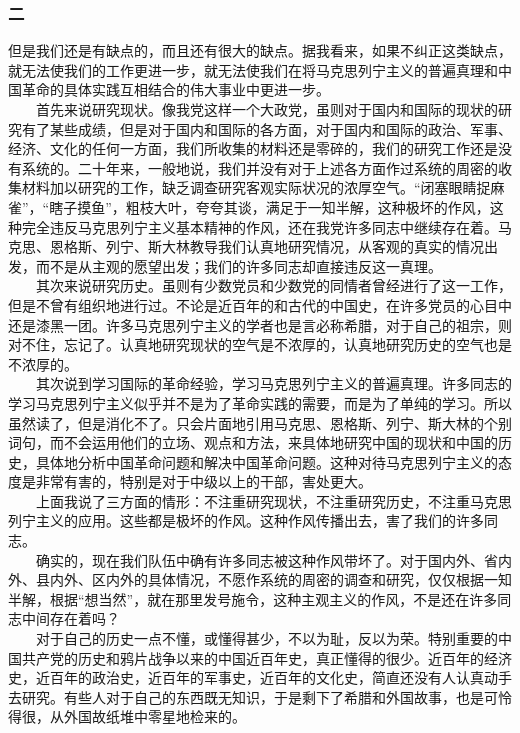 \documentclass[cn,11pt,chinese]{elegantbook}
\def\myformat#1{\hfil\hfil #1}
\begin{document}
\subsubsection*{\myformat{二}}
但是我们还是有缺点的，而且还有很大的缺点。据我看来，如果不纠正这类缺点，就无法使我们的工作更进一步，就无法使我们在将马克思列宁主义的普遍真理和中国革命的具体实践互相结合的伟大事业中更进一步。\\
　　首先来说研究现状。像我党这样一个大政党，虽则对于国内和国际的现状的研究有了某些成绩，但是对于国内和国际的各方面，对于国内和国际的政治、军事、经济、文化的任何一方面，我们所收集的材料还是零碎的，我们的研究工作还是没有系统的。二十年来，一般地说，我们并没有对于上述各方面作过系统的周密的收集材料加以研究的工作，缺乏调查研究客观实际状况的浓厚空气。“闭塞眼睛捉麻雀”，“瞎子摸鱼”，粗枝大叶，夸夸其谈，满足于一知半解，这种极坏的作风，这种完全违反马克思列宁主义基本精神的作风，还在我党许多同志中继续存在着。马克思、恩格斯、列宁、斯大林教导我们认真地研究情况，从客观的真实的情况出发，而不是从主观的愿望出发；我们的许多同志却直接违反这一真理。\\
　　其次来说研究历史。虽则有少数党员和少数党的同情者曾经进行了这一工作，但是不曾有组织地进行过。不论是近百年的和古代的中国史，在许多党员的心目中还是漆黑一团。许多马克思列宁主义的学者也是言必称希腊，对于自己的祖宗，则对不住，忘记了。认真地研究现状的空气是不浓厚的，认真地研究历史的空气也是不浓厚的。\\
　　其次说到学习国际的革命经验，学习马克思列宁主义的普遍真理。许多同志的学习马克思列宁主义似乎并不是为了革命实践的需要，而是为了单纯的学习。所以虽然读了，但是消化不了。只会片面地引用马克思、恩格斯、列宁、斯大林的个别词句，而不会运用他们的立场、观点和方法，来具体地研究中国的现状和中国的历史，具体地分析中国革命问题和解决中国革命问题。这种对待马克思列宁主义的态度是非常有害的，特别是对于中级以上的干部，害处更大。\\
　　上面我说了三方面的情形：不注重研究现状，不注重研究历史，不注重马克思列宁主义的应用。这些都是极坏的作风。这种作风传播出去，害了我们的许多同志。\\
　　确实的，现在我们队伍中确有许多同志被这种作风带坏了。对于国内外、省内外、县内外、区内外的具体情况，不愿作系统的周密的调查和研究，仅仅根据一知半解，根据“想当然”，就在那里发号施令，这种主观主义的作风，不是还在许多同志中间存在着吗？\\
　　对于自己的历史一点不懂，或懂得甚少，不以为耻，反以为荣。特别重要的中国共产党的历史和鸦片战争以来的中国近百年史，真正懂得的很少。近百年的经济史，近百年的政治史，近百年的军事史，近百年的文化史，简直还没有人认真动手去研究。有些人对于自己的东西既无知识，于是剩下了希腊和外国故事，也是可怜得很，从外国故纸堆中零星地检来的。\\
\end{document}
